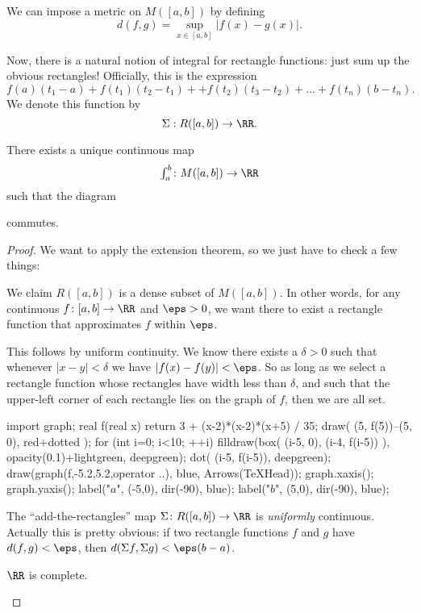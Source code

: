\begin{definition}
	We can impose a metric on $M([a,b])$
	by defining
	\[ d(f,g) = \sup_{x \in [a,b]} \left\lvert f(x) - g(x) \right\rvert. \]
\end{definition}

Now, there is a natural notion of integral
for rectangle functions: just sum up the obvious rectangles!
Officially, this is the expression
\[ f(a)(t_1-a) + f(t_1)(t_2-t_1) +
	+ f(t_2) \left( t_3 - t_2 \right)
	+ \dots + f(t_n) \left( b - t_n \right).  \]
We denote this function by
\[ \Sigma : R([a,b]) \to \RR. \]

\begin{theorem}
	\label{thm:gaitsgory_riemann}
	There exists a unique continuous map
	\[ \textstyle{\int_a^b} \colon M([a,b]) \to \RR \]
	such that the diagram
	\begin{center}
	\end{center}
	commutes.
\end{theorem}
\begin{proof}
	We want to apply the extension theorem,
	so we just have to check a few things:
	\begin{itemize}
		\ii We claim $R([a,b])$ is a dense subset of $M([a,b])$.
		In other words, for any continuous $f \colon [a,b] \to \RR$
		and $\eps > 0$,
		we want there to exist a rectangle function
		that approximates $f$ within $\eps$.

		This follows by uniform continuity.
		We know there exists a $\delta > 0$ such
		that whenever $|x-y| < \delta$ we have $|f(x)-f(y)| < \eps$.
		So as long as we select a rectangle function
		whose rectangles have width less than $\delta$,
		and such that the upper-left corner of each rectangle
		lies on the graph of $f$, then we are all set.

		\begin{center}
		\begin{asy}
			import graph;
			real f(real x) { return 3 + (x-2)*(x-2)*(x+5) / 35; }
			draw( (5, f(5))--(5, 0), red+dotted );
			for (int i=0; i<10; ++i) {
				filldraw(box( (i-5, 0), (i-4, f(i-5)) ),
					opacity(0.1)+lightgreen, deepgreen);
				dot( (i-5, f(i-5)), deepgreen);
			}
			draw(graph(f,-5.2,5.2,operator ..), blue, Arrows(TeXHead));
			graph.xaxis();
			graph.yaxis();
			label("$a$", (-5,0), dir(-90), blue);
			label("$b$", (5,0), dir(-90), blue);
		\end{asy}
		\end{center}


		\ii The ``add-the-rectangles'' map $\Sigma \colon R([a,b]) \to \RR$
		is \emph{uniformly} continuous.
		Actually this is pretty obvious:
		if two rectangle functions $f$ and $g$
		have $d(f,g) < \eps$,
		then $d(\Sigma f, \Sigma g) < \eps(b-a)$.

		\ii $\RR$ is complete.\qedhere
	\end{itemize}
\end{proof}

